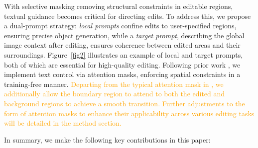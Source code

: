 \documentclass{article}
\begin{document}

With selective masking removing structural constraints in editable regions, textual guidance becomes critical for directing edits. To address this, we propose a dual-prompt strategy: \emph{local prompts} confine edits to user-specified regions, ensuring precise object generation, while a \emph{target prompt}, describing the global image context after editing, ensures coherence between edited areas and their surroundings. Figure~\ref{fig2} illustrates an example of local and target prompts, both of which are essential for high-quality editing. Following prior work \citep{chen2024training}, we implement text control via attention masks, enforcing spatial constraints in a training-free manner. \textcolor{orange}{Departing from the typical attention mask in \citep{chen2024training}, we additionally allow the boundary region to attend to both the edited and background regions to achieve a smooth transition. Further adjustments to the form of attention masks to enhance their applicability across various editing tasks will be detailed in the method section. }


In summary, we make the following key contributions in this paper:
\end{document}
